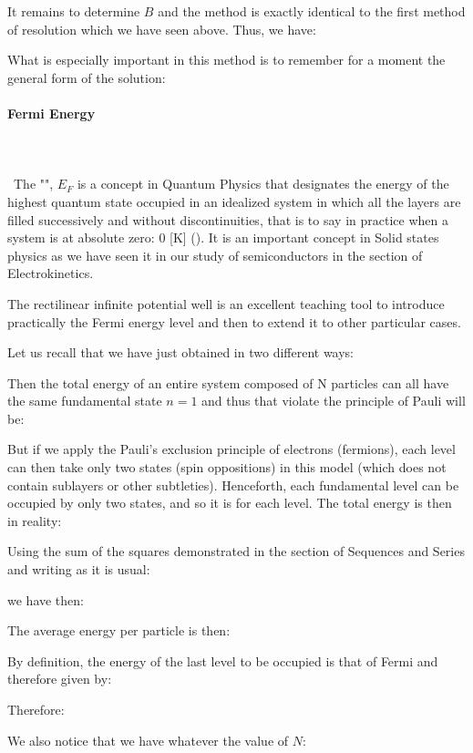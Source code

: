 	It remains to determine $B$ and the method is exactly identical to the first method of resolution which we have seen above. Thus, we have:
	
	What is especially important in this method is to remember for a moment the general form of the solution:
	
	
	\pagebreak
	\paragraph{Fermi Energy}\mbox{}\\\\\
	The "", $E_F$ is a concept in Quantum Physics that designates the energy of the highest quantum state occupied in an idealized system in which all the layers are filled successively and without discontinuities, that is to say in practice when a system is at absolute zero: $0$ [K] (). It is an important concept in Solid states physics as we have seen it in our study of semiconductors in the section of Electrokinetics.
	
	The rectilinear infinite potential well is an excellent teaching tool to introduce practically the Fermi energy level and then to extend it to other particular cases.

	Let us recall that we have just obtained in two different ways:
	
	Then the total energy of an entire system composed of N particles can all have the same fundamental state $n = 1$ and thus that violate the principle of Pauli will be:
	
	But if we apply the Pauli's exclusion principle of electrons (fermions), each level can then take only two states (spin oppositions) in this model (which does not contain sublayers or other subtleties). Henceforth, each fundamental level can be occupied by only two states, and so it is for each level. The total energy is then in reality:
	
	Using the sum of the squares demonstrated in the section of Sequences and Series and writing as it is usual:
	
	we have then:
	
	The average energy per particle is then:
	
	By definition, the energy of the last level to be occupied is that of Fermi and therefore given by:
	
	Therefore:
	
	We also notice that we have whatever the value of $N$:
	
